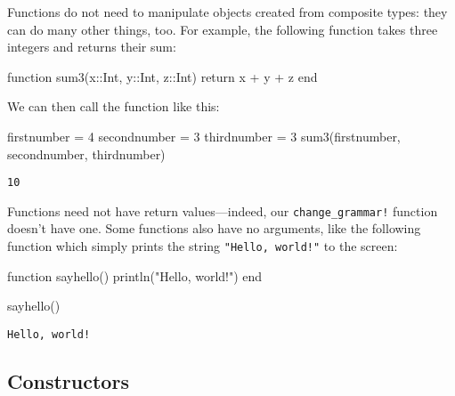 \documentclass[
  letterpaper,
  DIV=11,
  numbers=noendperiod]{scrartcl}
\newenvironment{Shaded}{\begin{snugshade}}{\end{snugshade}}
\newcommand{\ControlFlowTok}[1]{\textcolor[rgb]{0.00,0.23,0.31}{#1}}
\newcommand{\DataTypeTok}[1]{\textcolor[rgb]{0.68,0.00,0.00}{#1}}
\newcommand{\FloatTok}[1]{\textcolor[rgb]{0.68,0.00,0.00}{#1}}
\newcommand{\FunctionTok}[1]{\textcolor[rgb]{0.28,0.35,0.67}{#1}}
\newcommand{\KeywordTok}[1]{\textcolor[rgb]{0.00,0.23,0.31}{#1}}
\newcommand{\NormalTok}[1]{\textcolor[rgb]{0.00,0.23,0.31}{#1}}
\newcommand{\OperatorTok}[1]{\textcolor[rgb]{0.37,0.37,0.37}{#1}}
\newcommand{\StringTok}[1]{\textcolor[rgb]{0.13,0.47,0.30}{#1}}
\begin{document}
Functions do not need to manipulate objects created from composite
types: they can do many other things, too. For example, the following
function takes three integers and returns their sum:

\begin{Shaded}
\begin{Highlighting}[]
\KeywordTok{function} \FunctionTok{sum3}\NormalTok{(x}\OperatorTok{::}\DataTypeTok{Int}\NormalTok{, y}\OperatorTok{::}\DataTypeTok{Int}\NormalTok{, z}\OperatorTok{::}\DataTypeTok{Int}\NormalTok{)}
  \ControlFlowTok{return}\NormalTok{ x }\OperatorTok{+}\NormalTok{ y }\OperatorTok{+}\NormalTok{ z}
\KeywordTok{end}
\end{Highlighting}
\end{Shaded}

We can then call the function like this:

\begin{Shaded}
\begin{Highlighting}[]
\NormalTok{firstnumber }\OperatorTok{=} \FloatTok{4}
\NormalTok{secondnumber }\OperatorTok{=} \FloatTok{3}
\NormalTok{thirdnumber }\OperatorTok{=} \FloatTok{3}
\FunctionTok{sum3}\NormalTok{(firstnumber, secondnumber, thirdnumber)}
\end{Highlighting}
\end{Shaded}

\begin{verbatim}
10
\end{verbatim}

Functions need not have return values---indeed, our
\texttt{change\_grammar!} function doesn't have one. Some functions also
have no arguments, like the following function which simply prints the
string \texttt{"Hello,\ world!"} to the screen:

\begin{Shaded}
\begin{Highlighting}[]
\KeywordTok{function} \FunctionTok{sayhello}\NormalTok{()}
  \FunctionTok{println}\NormalTok{(}\StringTok{"Hello, world!"}\NormalTok{)}
\KeywordTok{end}

\FunctionTok{sayhello}\NormalTok{()}
\end{Highlighting}
\end{Shaded}

\begin{verbatim}
Hello, world!
\end{verbatim}

\subsection{Constructors}\label{constructors}
\end{document}
